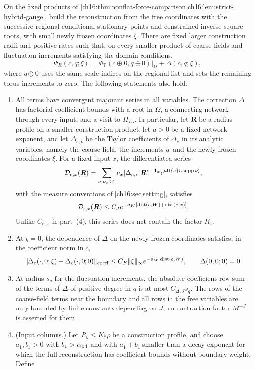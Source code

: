\begin{theorem}\label{ch16:thm:hybrid-columns}
On the fixed products of \cref{ch16:thm:nonflat-force-comparison,ch16:lem:strict-hybrid-gauge}, build the reconstruction from the free coordinates with the successive regional conditional stationary points and constrained inverse square roots, with small newly frozen coordinates $\xi$. There are fixed larger construction radii and positive rates such that, on every smaller product of coarse fields and fluctuation increments satisfying the domain conditions,
\[
 \Phi_R(c,q;\xi)
    =\Phi_{\mathbb T}(c\oplus0,q\oplus0)|_\Omega
                                      +\Delta(c,q;\xi),
\]
where $q\oplus0$ uses the same scale indices on the regional list and sets the remaining torus increments to zero. The following statements also hold.
\begin{enumerate}
\item All terms have convergent majorant series in all variables. The correction $\Delta$ has factorial coefficient bounds with a root in $\Omega$, a connecting network through every input, and a visit to $H_{L_J}$. In particular, let $\boldsymbol R$ be a radius profile on a smaller construction product, let $a>0$ be a fixed network exponent, and let $\Delta_{e,\nu}$ be the Taylor coefficients of $\Delta_e$ in its analytic variables, namely the coarse field, the increments $q$, and the newly frozen coordinates $\xi$. For a fixed input $x$, the differentiated series
\[
 \mathcal D_{e,x}(\boldsymbol R)
    =\sum_{\nu:\nu_x\ge1}\nu_x|\Delta_{e,\nu}|
       \boldsymbol R^{\nu-\mathbf 1_x}
       e^{a\mathsf t(\{e\}\cup\operatorname{supp}\nu)},
\]
with the measure conventions of \cref{ch16:sec:setting}, satisfies
\[
 \mathcal D_{e,x}(\boldsymbol R)\le C_Je^{-a_W[\operatorname{dist}(e,W)+\operatorname{dist}(e,x)]}.
\]
Unlike $C_{e,x}$ in part~(4), this series does not contain the factor $R_x$.
\item At $q=0$, the dependence of $\Delta$ on the newly frozen coordinates satisfies, in the coefficient norm in $c$,
\[
 \|\Delta_e(\cdot,0;\xi)-\Delta_e(\cdot,0;0)\|_{\mathrm{coeff}}
        \le C_F\|\xi\|_\infty e^{-a_W\operatorname{dist}(e,W)},
 \qquad \Delta(0,0;0)=0.
\]
\item At radius $s_q$ for the fluctuation increments, the absolute coefficient row sum of the terms of $\Delta$ of positive degree in $q$ is at most $C_{\Delta,J}s_q$. The rows of the coarse-field terms near the boundary and all rows in the free variables are only bounded by finite constants depending on $J$; no contraction factor $M^{-J}$ is asserted for them.
\item (Input columns.) Let $R_y\le K_*\rho$ be a construction profile, and choose $a_1,b_1>0$ with $b_1>\alpha_{\mathrm{bd}}$ and with $a_1+b_1$ smaller than a decay exponent for which the full reconstruction has coefficient bounds without boundary weight. Define

\end{enumerate}
\end{theorem}

